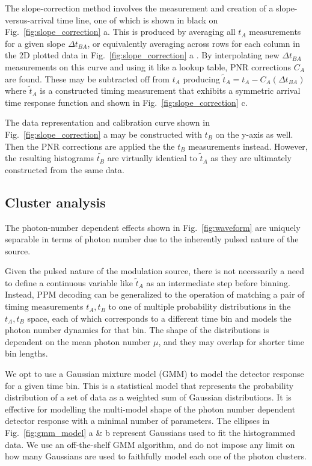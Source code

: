\documentclass[11pt]{caltech_thesis} %
\begin{document}
The slope-correction method involves the measurement and creation of a slope-versus-arrival time line, one of which is shown in black on Fig.~\ref{fig:slope_correction} a. This is produced by averaging all $t_A$ measurements for a given slope $\Delta t_{BA}$, or equivalently averaging across rows for each column in the 2D plotted data in Fig.~\ref{fig:slope_correction} a . By interpolating new $\Delta t_{BA}$ measurements on this curve and using it like a lookup table, PNR corrections $C_A$ are found. These may be subtracted off from $t_A$ producing $\tilde{t}_A = t_A - C_A(\Delta t_{BA})$ where $\tilde{t}_A$ is a constructed timing measurement that exhibits a symmetric arrival time response function and shown in Fig.~\ref{fig:slope_correction} c.~

The data representation and calibration curve shown in Fig.~\ref{fig:slope_correction} a may be constructed with $t_B$ on the y-axis as well. Then the PNR corrections are applied the the $t_B$ measurements instead. However, the resulting histograms $\tilde{t_B}$ are virtually identical to $\tilde{t}_A$ as they are ultimately constructed from the same data.

\hypertarget{cluster-analysis}{%
\subsection{Cluster analysis}\label{cluster-analysis}}

The photon-number dependent effects shown in Fig.~\ref{fig:waveform} are uniquely separable in terms of photon number due to the inherently pulsed nature of the source.

Given the pulsed nature of the modulation source, there is not necessarily a need to define a continuous variable like $\tilde{t}_A$ as an intermediate step before binning. Instead, PPM decoding can be generalized to the operation of matching a pair of timing measurements $t_A, t_B$ to one of multiple probability distributions in the $t_A, t_B$ space, each of which corresponds to a different time bin and models the photon number dynamics for that bin. The shape of the distributions is dependent on the mean photon number $\mu$, and they may overlap for shorter time bin lengths.

We opt to use a Gaussian mixture model (GMM) to model the detector response for a given time bin. This is a statistical model that represents the probability distribution of a set of data as a weighted sum of Gaussian distributions. It is effective for modelling the multi-model shape of the photon number dependent detector response with a minimal number of parameters. The ellipses in Fig.~\ref{fig:gmm_model} a \& b represent Gaussians used to fit the histogrammed data. We use an off-the-shelf GMM algorithm, and do not impose any limit on how many Gaussians are used to faithfully model each one of the photon clusters.
\end{document}
